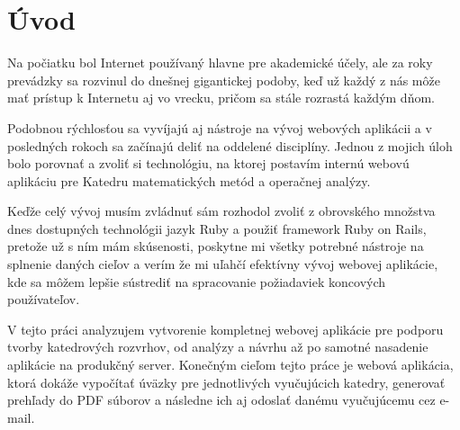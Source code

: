 \chapter*{Úvod}



Na počiatku bol Internet používaný hlavne pre akademické účely, ale za roky prevádzky sa rozvinul do dnešnej gigantickej podoby, keď už každý z nás môže mať prístup k Internetu aj vo vrecku, pričom sa stále rozrastá každým dňom.

Podobnou rýchlosťou sa vyvíjajú aj nástroje na vývoj webových aplikácii a v posledných rokoch sa začínajú deliť na oddelené disciplíny. Jednou z mojich úloh bolo porovnať a zvoliť si technológiu, na ktorej postavím internú webovú aplikáciu pre Katedru matematických metód a operačnej analýzy.

Keďže celý vývoj musím zvládnuť sám rozhodol zvoliť z obrovského množstva dnes dostupných technológii jazyk Ruby a použiť framework Ruby on Rails, pretože už s ním mám skúsenosti, poskytne mi všetky potrebné nástroje na splnenie daných cieľov a verím že mi uľahčí efektívny vývoj webovej aplikácie, kde sa môžem lepšie sústrediť na spracovanie požiadaviek koncových používateľov.

V tejto práci analyzujem vytvorenie kompletnej webovej aplikácie pre podporu tvorby katedrových rozvrhov, od analýzy a návrhu až po samotné nasadenie aplikácie na produkčný server. Konečným cieľom tejto práce je webová aplikácia, ktorá dokáže vypočítať úväzky pre jednotlivých vyučujúcich katedry, generovať prehľady do PDF súborov a následne ich aj odoslať danému vyučujúcemu cez e-mail.